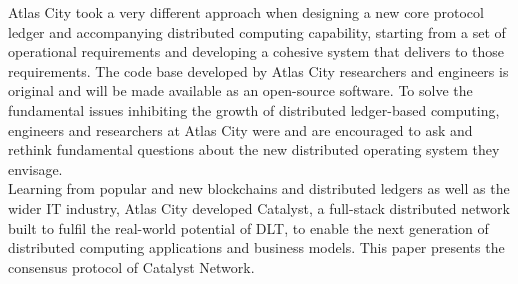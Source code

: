 Atlas City took a very different approach when designing a new core protocol ledger and accompanying distributed computing capability, starting from a set of operational requirements and developing a cohesive system that delivers to those requirements. The code base developed by Atlas City researchers and engineers is original and will be made available as an open-source software. To solve the fundamental issues inhibiting the growth of distributed ledger-based computing, engineers and researchers at Atlas City were and are encouraged to ask and rethink fundamental questions about the new distributed operating system they envisage.\\

Learning from popular and new blockchains and distributed ledgers as well as the wider IT industry, Atlas City developed Catalyst, a full-stack distributed network  built to fulfil the real-world potential of DLT, to enable the next generation of distributed computing applications and business models. This paper presents the consensus protocol of Catalyst Network. 
